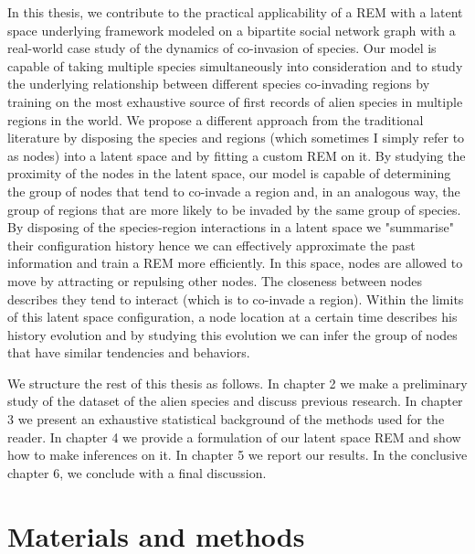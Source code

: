\documentclass[mscthesis]{usiinfthesis}
\begin{document}


In this thesis, we contribute to the practical applicability of a REM with a latent space underlying framework modeled on a bipartite social network graph with a real-world case study of the dynamics of co-invasion of species. Our model is capable of taking multiple species simultaneously into consideration and to study the underlying relationship between different species co-invading regions by training on the most exhaustive source of first records of alien species in multiple regions in the world. We propose a different approach from the traditional literature by disposing the species and regions (which sometimes I simply refer to as nodes) into a latent space and by fitting a custom REM on it. By studying the proximity of the nodes in the latent space, our model is capable of determining the group of nodes that tend to co-invade a region and, in an analogous way, the group of regions that are more likely to be invaded by the same group of species.  By disposing of the species-region interactions in a latent space we "summarise" their configuration history hence we can effectively approximate the past information and train a REM more efficiently. In this space, nodes are allowed to move by attracting or repulsing other nodes. The closeness between nodes describes they tend to interact (which is to co-invade a region). Within the limits of this latent space configuration, a node location at a certain time describes his history evolution and by studying this evolution we can infer the group of nodes that have similar tendencies and behaviors.


We structure the rest of this thesis as follows. In chapter 2 we make a preliminary study of the dataset of the alien species and discuss previous research. In chapter 3 we present an exhaustive statistical background of the methods used for the reader. In chapter 4 we provide a formulation of our latent space REM and show how to make inferences on it. In chapter 5 we report our results. In the conclusive chapter 6, we conclude with a final discussion.



\chapter{Materials and methods}
\end{document}
